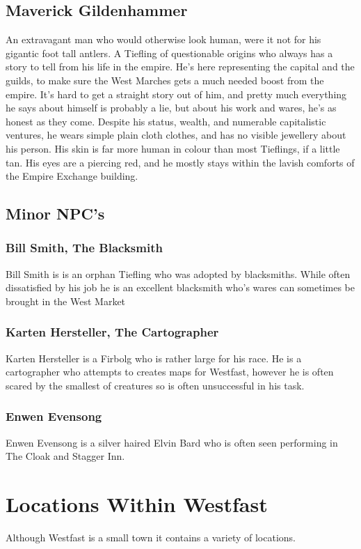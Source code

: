 \subsection{Maverick Gildenhammer}
An extravagant man who would otherwise look human, were it not for his gigantic foot tall antlers. A Tiefling of questionable origins who always has a story to tell from his life in the empire. He's here representing the capital and the guilds, to make sure the West Marches gets a much needed boost from the empire.
\newline
It's hard to get a straight story out of him, and pretty much everything he says about himself is probably a lie, but about his work and wares, he's as honest as they come.
\newline
Despite his status, wealth, and numerable capitalistic ventures, he wears simple plain cloth clothes, and has no visible jewellery about his person. His skin is far more human in colour than most Tieflings, if a little tan. His eyes are a piercing red, and he mostly stays within the lavish comforts of the Empire Exchange building.

\subsection{Minor NPC's}
\subsubsection{Bill Smith, The Blacksmith}
Bill Smith is is an orphan Tiefling who was adopted by blacksmiths. While often dissatisfied by his job he is an excellent blacksmith who's wares can sometimes be brought in the West Market
\subsubsection{Karten Hersteller, The Cartographer}
Karten Hersteller is a Firbolg who is rather large for his race. He is a cartographer who attempts to creates maps for Westfast, however he is often scared by the smallest of creatures so is often unsuccessful in his task.
\subsubsection{Enwen Evensong}
Enwen Evensong is a silver haired Elvin Bard who is often seen performing in The Cloak and Stagger Inn.
\section{Locations Within Westfast}
Although Westfast is a small town it contains a variety of locations.
